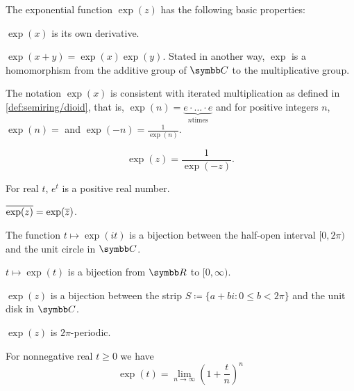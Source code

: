 \begin{proposition}\label{thm:exponential_function_properties}
  The exponential function \( \exp(z) \) has the following basic properties:

  \begin{thmenum}
     \( \exp(x) \) is its own derivative.

     \( \exp(x + y) = \exp(x) \exp(y) \). Stated in another way, \( \exp \) is a homomorphism from the additive group of \( \C \) to the multiplicative group.

     The notation \( \exp(x) \) is consistent with iterated multiplication as defined in \cref{def:semiring/dioid}, that is, \( \exp(n) = \underbrace{e \cdot \ldots \cdot e}_{n \text{times}} \) and for positive integers \( n \), \( \exp(n) =  \) and \( \exp(-n) =\tfrac 1 {\exp(n)} \).

    \begin{equation*}
      \exp(z) = \frac 1 {\exp(-z)}.
    \end{equation*}

     For real \( t \), \( e^t \) is a positive real number.

     \( \overline{\exp(z)} = \exp(\overline{z}) \).

     The function \( t \mapsto \exp(it) \) is a bijection between the half-open interval \( [0, 2\pi) \) and the unit circle in \( \C \).

     \( t \mapsto \exp(t) \) is a bijection from \( \R \) to \( [0, \infty) \).

     \( \exp(z) \) is a bijection between the strip \( S \coloneqq \{ a + bi \colon 0 \leq b < 2\pi \} \) and the unit disk in \( \C \).

     \( \exp(z) \) is \( 2\pi \)-periodic.

     For nonnegative real \( t \geq 0 \) we have
    \begin{equation*}
      \exp(t) = \lim_{n \to \infty} \left(1 + \frac t n \right)^n
    \end{equation*}
  \end{thmenum}
\end{proposition}
